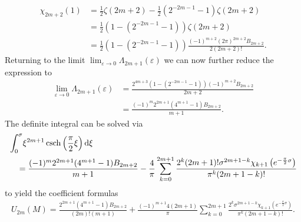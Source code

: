 \begin{align}
\chi_{2m+2}(1) &= \frac{1}{2}\zeta(2m+2) - \frac{1}{2}(2^{-2m-1}-1)\zeta(2m+2) \\
               &= \frac{1}{2}\left(1 - \left(2^{-2m-1}-1\right)\right)\zeta(2m+2) \\
               &= \frac{1}{2}\left(1 - \left(2^{-2m-1}-1\right)\right)
                  \frac{(-1)^{m+2}(2\pi)^{2m+2}B_{2m+2}}{2(2m+2)!}.
\end{align}
Returning to the limit $\lim_{\varepsilon \to 0} \Lambda_{2m+1}(\varepsilon)$ we can
now further reduce the expression to
\begin{align}
	\lim_{\varepsilon \to 0} \Lambda_{2m+1}(\varepsilon) 
	    &= \frac{2^{4m+3}\left(1 - \left(2^{-2m-1}-1\right)\right)(-1)^{m+2} B_{2m+2}}
	            {2m+2} \\
	    &= \frac{(-1)^m 2^{2m+1} \left(4^{m+1} - 1\right) B_{2m+2}}{m+1}.
\end{align}
The definite integral can be solved via
\begin{align}
	&\int_0^\sigma \! \xi^{2m+1} \operatorname{csch}\left(\frac{\pi}{2}\xi\right) \mathrm{d}\xi \\
	    &\quad = \frac{(-1)^m 2^{2m+1}(4^{m+1}-1)B_{2m+2}}{m+1}
	        - \frac{4}{\pi} \sum_{k=0}^{2m+1}
	            \frac{2^k(2m+1)!\sigma^{2m+1-k}\chi_{k+1}\left(e^{-\frac{\pi}{2}\sigma}\right)}
	                 {\pi^k (2m+1-k)!}
\end{align}
to yield the coefficient formulas
\begin{align}
U_{2m}(M) = \frac{2^{2m+1}(4^{m+1}-1)B_{2m+2}}{(2m)!(m+1)}
+ \frac{(-1)^{m+1} 4 (2m+1)}{\pi} \sum_{k=0}^{2m+1}
\frac{2^k\sigma^{2m+1-k}\chi_{k+1}\left(e^{-\frac{\pi}{2}\sigma}\right)}
{\pi^k (2m+1-k)!}.
\end{align}


